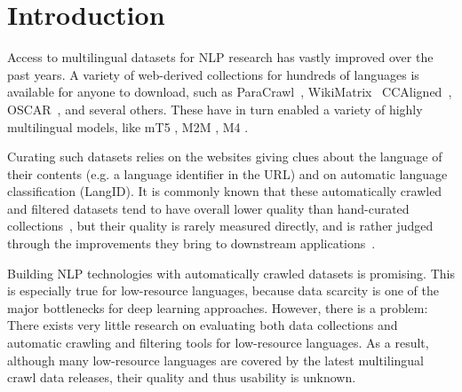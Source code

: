 \section{Introduction}
Access to multilingual datasets for NLP research has vastly improved over the past years. A variety of web-derived collections for hundreds of languages is available for anyone to download, such as ParaCrawl~\citep{espla-etal-2019-paracrawl, banon-etal-2020-paracrawl}, WikiMatrix~\citep{schwenk-etal-2021-wikimatrix} CCAligned~\citep{el-kishky-etal-2020-ccaligned}, \mbox{OSCAR}~\citep{ortiz-suarez-etal-2019-asynchronous, ortiz-suarez-etal-2020-monolingual}, and several others.
These have in turn enabled a variety of highly multilingual models, like mT5 \citep{xue-etal-2021-mt5}, M2M \citep{fan-etal-2020-beyond}, M4 \citep{arivazhagan-etal-2019-massively}.

Curating such datasets relies on the websites giving clues about the language of their contents (e.g. a language identifier in the URL) and on automatic language classification (LangID).
It is commonly known that these automatically crawled and filtered datasets tend to have overall lower quality than hand-curated collections~\citep{koehn-etal-2020-findings}, but their quality is rarely measured directly, and is rather judged through the improvements they bring to downstream applications~\citep{schwenk-etal-2021-wikimatrix}.

Building NLP technologies with automatically crawled datasets is promising. This is especially true for low-resource languages, because data scarcity is one of the major bottlenecks for deep learning approaches.
However, there is a problem: There exists very little research on evaluating both data collections and automatic crawling and filtering tools for low-resource languages.
As a result, although many low-resource languages are covered by the latest multilingual crawl data releases, their quality and thus usability is unknown. %

